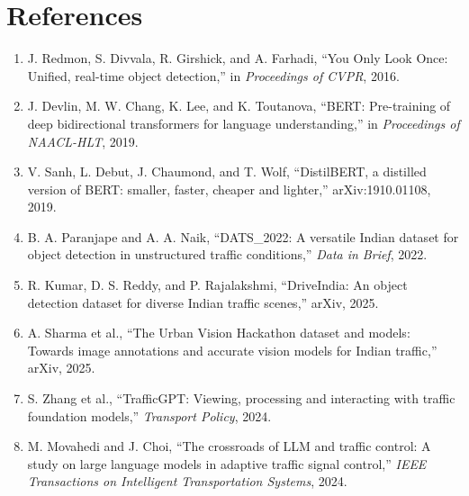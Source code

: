 \documentclass[12pt,a4paper]{report}
\begin{document}
\chapter*{References}
\begin{enumerate}[leftmargin=1cm]
\item J. Redmon, S. Divvala, R. Girshick, and A. Farhadi, ``You Only Look Once: Unified, real-time object detection,'' in \textit{Proceedings of CVPR}, 2016.
\item J. Devlin, M. W. Chang, K. Lee, and K. Toutanova, ``BERT: Pre-training of deep bidirectional transformers for language understanding,'' in \textit{Proceedings of NAACL-HLT}, 2019.
\item V. Sanh, L. Debut, J. Chaumond, and T. Wolf, ``DistilBERT, a distilled version of BERT: smaller, faster, cheaper and lighter,'' arXiv:1910.01108, 2019.
\item B. A. Paranjape and A. A. Naik, ``DATS\_2022: A versatile Indian dataset for object detection in unstructured traffic conditions,'' \textit{Data in Brief}, 2022.
\item R. Kumar, D. S. Reddy, and P. Rajalakshmi, ``DriveIndia: An object detection dataset for diverse Indian traffic scenes,'' arXiv, 2025.
\item A. Sharma et al., ``The Urban Vision Hackathon dataset and models: Towards image annotations and accurate vision models for Indian traffic,'' arXiv, 2025.
\item S. Zhang et al., ``TrafficGPT: Viewing, processing and interacting with traffic foundation models,'' \textit{Transport Policy}, 2024.
\item M. Movahedi and J. Choi, ``The crossroads of LLM and traffic control: A study on large language models in adaptive traffic signal control,'' \textit{IEEE Transactions on Intelligent Transportation Systems}, 2024.
\end{enumerate}
\end{document}
